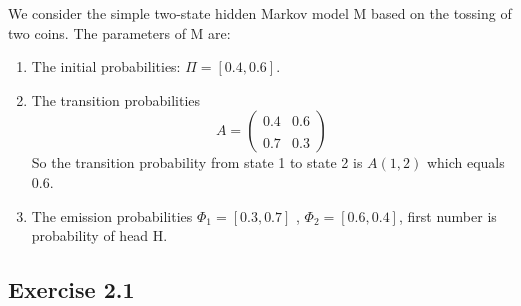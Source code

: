 \documentclass[11pt,a4paper]{article}
\begin{document}
	We consider the simple two-state hidden Markov model M based on the tossing of two coins. The parameters
	of M are:
	\begin{enumerate}
		\item The initial probabilities: $\Pi = [0.4, 0.6]$.
		\item The transition probabilities 
		$$ A = \left(\begin{smallmatrix} 0.4 & 0.6 \\ \\ 0.7 & 0.3 \end{smallmatrix} \right)  $$
		So the transition probability from state 1 to state 2 is $ A(1, 2) $ which equals 0.6.
		\item The emission probabilities $\Phi_1 = [0.3, 0.7]$ , $\Phi_2 = [0.6, 0.4]$, first number is probability of
		head H.
	\end{enumerate}
	
	\subsection*{Exercise 2.1}
	
	
	
	
\end{document}
